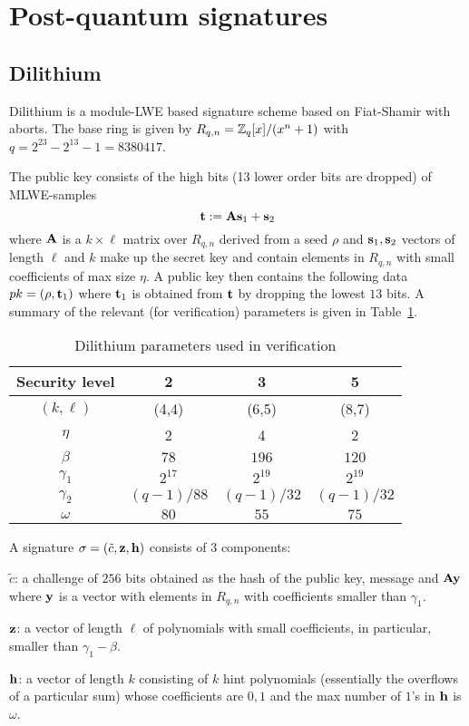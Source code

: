 \section{Post-quantum signatures}
 
\subsection{Dilithium}

Dilithium is a module-LWE based signature scheme based on Fiat-Shamir with aborts.  The base ring is given 
by $R_{q,n} = \mathbb{Z}_q[x]/(x^n+1)$ with $q = 2^{23} - 2^{13} - 1 = 8380417$.

The public key consists of the high bits (13 lower order bits are dropped) of MLWE-samples
\[ \mathbf{t} :=  \mathbf{A} \mathbf{s}_1 + \mathbf{s}_2 \]
where $\mathbf{A}$ is a $k \times \ell$  matrix over $R_{q,n}$ derived from a seed $\rho$ 
and $\mathbf{s}_1, \mathbf{s}_2$ vectors of length $\ell$ and $k$ make up the secret key and 
contain elements in $R_{q,n}$ with small coefficients of max size $\eta$.
A public key then contains the following data $pk = (\rho, \mathbf{t}_1)$ where $\mathbf{t}_1$
is obtained from $\mathbf{t}$ by dropping the lowest $13$ bits.
A summary of the relevant (for verification) parameters is given in Table~\ref{tab:dilithium}.

\begin{table}\caption{Dilithium parameters used in verification}\label{tab:dilithium}
\begin{center}
\begin{tabular}{c|c|c|c}
\hline
Security level & 2 & 3 & 5 \\
\hline
$(k,\ell)$ & (4,4) & (6,5) & (8,7) \\
$\eta$ & 2 & 4 & 2 \\
$\beta$ & $78$ & $196$ & $120$ \\
$\gamma_1$ & $2^{17}$ & $2^{19}$ & $2^{19}$ \\ 
$\gamma_2$ & $(q-1)/88$ & $(q-1)/32$ & $(q-1)/32$ \\
$\omega$ & $80$ & $55$ & $75$ \\
\hline
\end{tabular}
\end{center}
\end{table}

A signature $\sigma = (\tilde{c}, \mathbf{z}, \mathbf{h})$ consists of 3 components:
\bit
\item $\tilde{c}$: a challenge of $256$ bits obtained as the hash of the public key, message and $\mathbf{A} \mathbf{y}$ where $\mathbf{y}$
is a vector with elements in $R_{q,n}$ with coefficients smaller than $\gamma_1$. 
\item $\mathbf{z}$: a vector of length $\ell$ of polynomials with small coefficients, in particular, smaller than $\gamma_1 - \beta$.
\item $\mathbf{h}$: a vector of length $k$ consisting of $k$ hint polynomials (essentially the overflows of a particular sum) whose
coefficients are ${0,1}$ and the max number of $1$'s in $\mathbf{h}$ is $\omega$.
\eit

